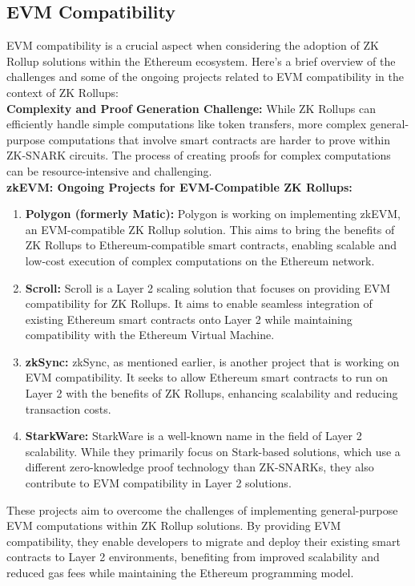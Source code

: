 \documentclass{report}
\begin{document}
\subsection{EVM Compatibility}
EVM compatibility is a crucial aspect when considering the adoption of ZK Rollup solutions within the Ethereum ecosystem. Here's a brief overview of the challenges and some of the ongoing projects related to EVM compatibility in the context of ZK Rollups:\\
\textbf{Complexity and Proof Generation Challenge:} While ZK Rollups can efficiently handle simple computations like token transfers, more complex general-purpose computations that involve smart contracts are harder to prove within ZK-SNARK circuits. The process of creating proofs for complex computations can be resource-intensive and challenging.\\
\textbf{zkEVM: Ongoing Projects for EVM-Compatible ZK Rollups:}\\
\begin{enumerate}
	\item \textbf{Polygon (formerly Matic):} Polygon is working on implementing zkEVM, an EVM-compatible ZK Rollup solution. This aims to bring the benefits of ZK Rollups to Ethereum-compatible smart contracts, enabling scalable and low-cost execution of complex computations on the Ethereum network.
	\item \textbf{Scroll:} Scroll is a Layer 2 scaling solution that focuses on providing EVM compatibility for ZK Rollups. It aims to enable seamless integration of existing Ethereum smart contracts onto Layer 2 while maintaining compatibility with the Ethereum Virtual Machine.
	\item \textbf{zkSync:} zkSync, as mentioned earlier, is another project that is working on EVM compatibility. It seeks to allow Ethereum smart contracts to run on Layer 2 with the benefits of ZK Rollups, enhancing scalability and reducing transaction costs.
	\item \textbf{StarkWare:} StarkWare is a well-known name in the field of Layer 2 scalability. While they primarily focus on Stark-based solutions, which use a different zero-knowledge proof technology than ZK-SNARKs, they also contribute to EVM compatibility in Layer 2 solutions.
\end{enumerate}
These projects aim to overcome the challenges of implementing general-purpose EVM computations within ZK Rollup solutions. By providing EVM compatibility, they enable developers to migrate and deploy their existing smart contracts to Layer 2 environments, benefiting from improved scalability and reduced gas fees while maintaining the Ethereum programming model.
\end{document}
